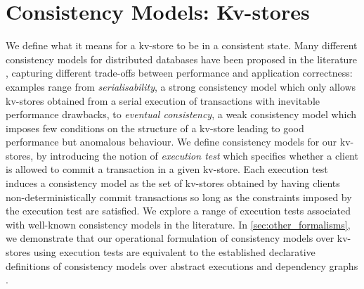 \section{Consistency Models: Kv-stores}
\label{sec:cm}
We define what it means for a kv-store 
to be in a consistent state. Many different consistency models for
distributed databases have 
been proposed in the literature
\cite{principle-eventual-consistency,rola,redblue,PSI,si},
capturing different trade-offs 
between  performance and application
correctness: examples range from  \emph{serialisability}, a strong
consistency model which only allows kv-stores 
obtained  from a serial execution of transactions
with inevitable performance drawbacks, to  \emph{eventual consistency},  a weak consistency model
which imposes few conditions on the structure of a kv-store leading to
good performance but anomalous behaviour.
We define consistency models for our kv-stores,
by introducing the notion of 
\emph{execution test} which specifies  whether a client is allowed to commit a transaction in a given 
kv-store. Each execution test induces a consistency model as the set of kv-stores obtained 
by having clients non-deterministically commit transactions so long as  the constraints 
imposed by the execution test are satisfied.
We explore a range of execution tests  associated with well-known consistency models in the literature. 
In \cref{sec:other_formalisms},  we demonstrate that our operational
formulation of  consistency models over kv-stores using execution
tests are  equivalent to the established declarative definitions of
consistency models  over abstract executions \cite{ev_transactions,framework-concur} and dependency graphs \cite{adya}.


%
%

